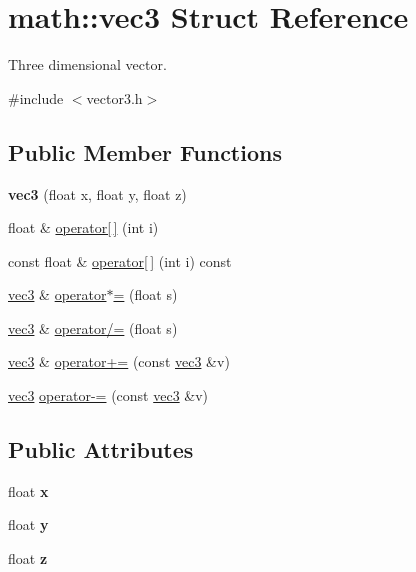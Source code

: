 \hypertarget{structmath_1_1vec3}{}\section{math\+:\+:vec3 Struct Reference}
\label{structmath_1_1vec3}


Three dimensional vector.  




{\ttfamily \#include $<$vector3.\+h$>$}

\subsection*{Public Member Functions}
\begin{DoxyCompactItemize}
\item 
\mbox{\label{structmath_1_1vec3_a56041c7d4745ffbeb12df19ffd228e7a}} 
{\bfseries vec3} (float x, float y, float z)
\item 
float \& \hyperlink{structmath_1_1vec3_ab44d4240ab19e9c9905e26ce192029b0}{operator\mbox{[}$\,$\mbox{]}} (int i)
\item 
const float \& \hyperlink{structmath_1_1vec3_aa3618efa56c52bafa76101a4c614bed6}{operator\mbox{[}$\,$\mbox{]}} (int i) const
\item 
\hyperlink{structmath_1_1vec3}{vec3} \& \hyperlink{structmath_1_1vec3_ad585c0077344f18e19adf83ff1a9b714}{operator$\ast$=} (float s)
\item 
\hyperlink{structmath_1_1vec3}{vec3} \& \hyperlink{structmath_1_1vec3_a33aaa0796a55338a5a9ccc126a4c396c}{operator/=} (float s)
\item 
\hyperlink{structmath_1_1vec3}{vec3} \& \hyperlink{structmath_1_1vec3_a46cf290e5c6454b514e96b8d6bffdf2d}{operator+=} (const \hyperlink{structmath_1_1vec3}{vec3} \&v)
\item 
\hyperlink{structmath_1_1vec3}{vec3} \hyperlink{structmath_1_1vec3_a4a9e71942931cebe75ca6c4a59e38e44}{operator-\/=} (const \hyperlink{structmath_1_1vec3}{vec3} \&v)
\end{DoxyCompactItemize}
\subsection*{Public Attributes}
\begin{DoxyCompactItemize}
\item 
\mbox{\label{structmath_1_1vec3_ac81d749b495547ce99fd0e92a2d7cfd9}} 
float {\bfseries x}
\item 
\mbox{\label{structmath_1_1vec3_a4df2cecd37051e9e67392d41a9348958}} 
float {\bfseries y}
\item 
\mbox{\label{structmath_1_1vec3_a776b1be89ea22b7adc32b499e34873b4}} 
float {\bfseries z}
\end{DoxyCompactItemize}
